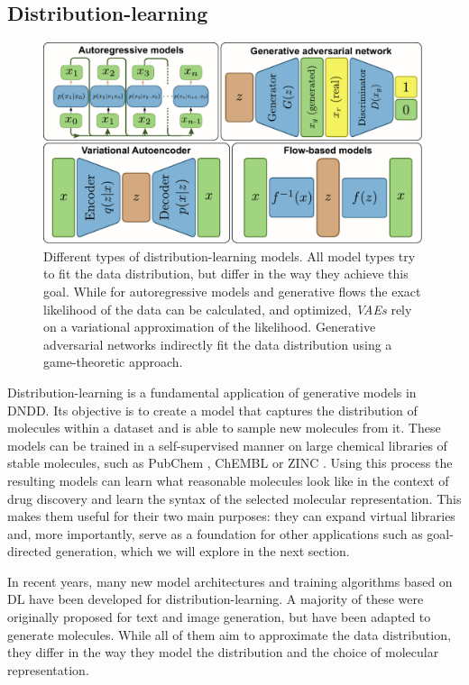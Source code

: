\subsection{Distribution-learning}
\begin{figure}
    \centering
    \includegraphics[width=0.99\textwidth]{figures/distribution-learning-models.pdf}
    \caption{Different types of distribution-learning models. All model types
        try to fit the data distribution, but differ in the way they achieve this goal.
        While for autoregressive models and generative flows the exact likelihood of the data can be calculated,
        and optimized, \emph{VAEs} rely on a variational approximation of the likelihood. Generative adversarial networks
        indirectly fit the data distribution using a game-theoretic approach. \label{fig:distribution-learning-models}}
\end{figure}
Distribution-learning is a fundamental application of generative models in \ac{DNDD}. Its
objective is to create a model that captures the distribution of molecules within a dataset and is
able to sample new molecules from it. These models can be trained in a self-supervised manner on
large chemical libraries of stable molecules, such as PubChem
\citep{kimPubChemSubstanceCompound2016}, ChEMBL \citep{bentoChEMBLBioactivityDatabase2014} or ZINC
\citep{irwinZINCFreeTool2012}. Using this process the resulting models can learn what reasonable
molecules look like in the context of drug discovery and learn the syntax of the selected molecular
representation. This makes them useful for their two main purposes: they can expand virtual
libraries and, more importantly, serve as a foundation for other applications such as goal-directed
generation, which we will explore in the next section.

In recent years, many new model architectures and training algorithms based on \ac{DL} have been
developed for distribution-learning. A majority of these were originally proposed for text and
image generation, but have been adapted to generate molecules. While all of them aim to approximate
the data distribution, they differ in the way they model the distribution and the choice of
molecular representation.

